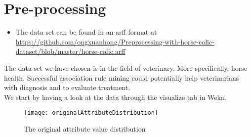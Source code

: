 \section{Pre-processing}

\begin{itemize}
\item The data set can be found in an arff format at \\ \href{github.com/ongxuanhong/Preprocessing-with-horse-colic-dataset/blob/master/horse-colic.arff}{https://github.com/ongxuanhong/Preprocessing-with-horse-colic-dataset/blob/master/horse-colic.arff}
\end{itemize}
The data set we have chosen is in the field of veterinary. More specifically, horse health. Successful association rule mining could potentially help veterinarians with diagnosis and  to evaluate treatment.\\
We start by having a look at the data through the visualize tab in Weka.
\begin{figure}[h!]
\centering
\texttt{[image: originalAttributeDistribution]}
\caption{The original attribute value distribution}
\end{figure}

